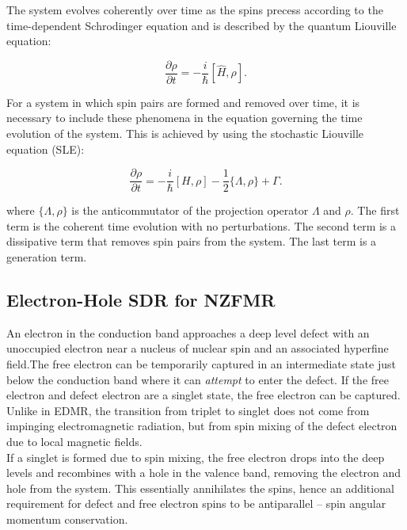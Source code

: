 \documentclass[svgnames]{article}
\begin{document}
The system evolves coherently over time as the spins precess according to the
time-dependent Schrodinger equation and is described by the quantum Liouville
equation: 

\[
    \frac{\partial \rho}{\partial t} = -\frac{i}{\hbar} \left[\hat{H},
    \rho\right]. 
\] \vspace{3px}


For a system in which spin pairs are formed and removed over time, it is
necessary to include these phenomena in the equation governing the time
evolution of the system. This is achieved by using the stochastic Liouville
equation (SLE): 

\[
    \frac{\partial \rho}{\partial t} = -\frac{i}{\hbar} \left[H, \rho\right] -
    \frac{1}{2} \{\Lambda,\rho\} + \Gamma.
\] \vspace{3px}

where $\{\Lambda, \rho\}$ is the anticommutator of the projection operator
$\Lambda$ and $\rho$. The first term is the coherent time evolution with no
perturbations. The second term is a dissipative term that removes spin pairs
from the system. The last term is a generation term. 

\subsection{Electron-Hole SDR for NZFMR} 

An electron in the conduction band approaches a deep level defect with an
unoccupied electron near a nucleus of nuclear spin and an associated hyperfine
field.The free electron can be temporarily captured in an intermediate state
just below the conduction band where it can \textit{attempt} to enter the
defect. If the free electron and defect electron are a singlet state, the free
electron can be captured. Unlike in EDMR, the transition from triplet to singlet
does not come from impinging electromagnetic radiation, but from spin mixing of
the defect electron due to local magnetic fields. \\ 

If a singlet is formed due to spin mixing, the free electron drops into the deep
levels and recombines with a hole in the valence band, removing the electron and
hole from the system. This essentially annihilates the spins, hence an
additional requirement for defect and free electron spins to be antiparallel --
spin angular momentum conservation. 
\end{document}
